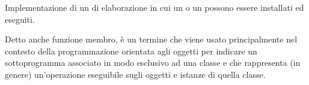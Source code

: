 {Implementazione  di un  di elaborazione in cui un  o un  possono essere installati ed eseguiti.}

{Detto anche funzione membro, è un termine che viene usato principalmente nel contesto della programmazione orientata agli oggetti per indicare un sottoprogramma associato in modo esclusivo ad una classe e che rappresenta (in genere) un'operazione eseguibile sugli oggetti e istanze di quella classe.}
